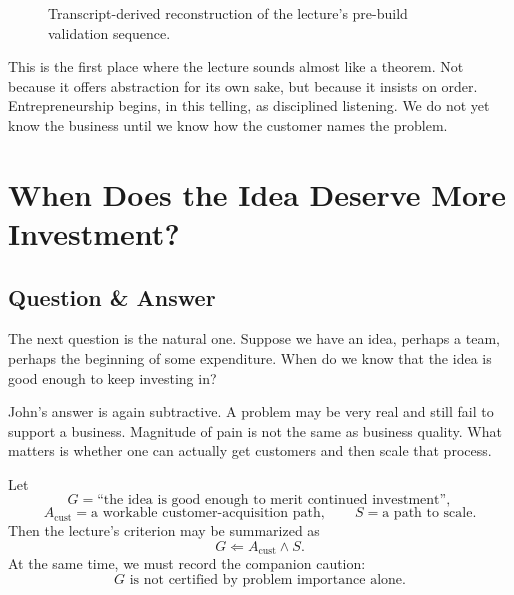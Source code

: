 \begin{figure}[h]
\centering
{}
\caption{Transcript-derived reconstruction of the lecture's pre-build validation sequence.}
\end{figure}

This is the first place where the lecture sounds almost like a theorem. Not because it offers abstraction for its own sake, but because it insists on order. Entrepreneurship begins, in this telling, as disciplined listening. We do not yet know the business until we know how the customer names the problem.

\section{When Does the Idea Deserve More Investment?}

\subsection{Question \& Answer}

The next question is the natural one. Suppose we have an idea, perhaps a team, perhaps the beginning of some expenditure. When do we know that the idea is good enough to keep investing in?

John's answer is again subtractive. A problem may be very real and still fail to support a business. Magnitude of pain is not the same as business quality. What matters is whether one can actually get customers and then scale that process.

Let
\[
G = \text{``the idea is good enough to merit continued investment''},
\]
\[
A_{\mathrm{cust}} = \text{a workable customer-acquisition path},\qquad
S = \text{a path to scale}.
\]
Then the lecture's criterion may be summarized as
\begin{equation}
G \Leftarrow A_{\mathrm{cust}} \land S.
\end{equation}
At the same time, we must record the companion caution:
\begin{equation}
G \text{ is not certified by problem importance alone.}
\end{equation}

